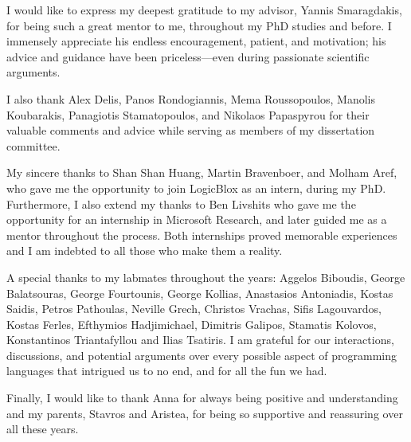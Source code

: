 I would like to express my deepest gratitude to my advisor, Yannis Smaragdakis, for being such a great mentor to me, throughout my PhD studies and before. I immensely appreciate his endless encouragement, patient, and motivation; his advice and guidance have been priceless---even during passionate scientific arguments.

I also thank Alex Delis, Panos Rondogiannis, Mema Roussopoulos, Manolis Koubarakis, Panagiotis Stamatopoulos, and Nikolaos Papaspyrou for their valuable comments and advice while serving as members of my dissertation committee.

My sincere thanks to Shan Shan Huang, Martin Bravenboer, and Molham Aref, who gave me the opportunity to join LogicBlox as an intern, during my PhD. Furthermore, I also extend my thanks to Ben Livshits who gave me the opportunity for an internship in Microsoft Research, and later guided me as a mentor throughout the process. Both internships proved memorable experiences and I am indebted to all those who make them a reality.

A special thanks to my labmates throughout the years: Aggelos Biboudis, George Balatsouras, George Fourtounis, George Kollias, Anastasios Antoniadis, Kostas Saidis, Petros Pathoulas, Neville Grech, Christos Vrachas, Sifis Lagouvardos, Kostas Ferles, Efthymios Hadjimichael, Dimitris Galipos, Stamatis Kolovos, Konstantinos Triantafyllou and Ilias Tsatiris. I am grateful for our interactions, discussions, and potential arguments over every possible aspect of programming languages that intrigued us to no end, and for all the fun we had.

Finally, I would like to thank Anna for always being positive and understanding and my parents, Stavros and Aristea, for being so supportive and reassuring over all these years.